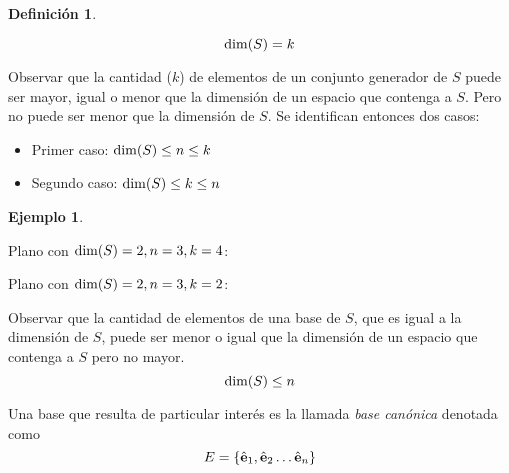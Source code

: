 \documentclass[a5paper,12pt,twoside]{book}
\newtheorem{defn}{{Definición}}[chapter]
\newtheorem{example}{{Ejemplo}}[chapter]
\begin{document}
\begin{mdframed}[style=MyFrame1]
    \begin{defn}
    \end{defn}
    \begin{equation*}
        \operatorname{dim}(S) = k
    \end{equation*}
\end{mdframed}

Observar que la cantidad ($k$) de elementos de un conjunto generador de $S$ puede ser mayor, igual o menor que la dimensión de un espacio que contenga a $S$. Pero no puede ser menor que la dimensión de $S$. Se identifican entonces dos casos:
\begin{itemize}
    \item Primer caso: $\operatorname{dim}(S) \leq n \leq k$
    \item Segundo caso: $\operatorname{dim}(S) \leq k \leq n$
\end{itemize}

\begin{mdframed}[style=MyFrame2]
    \begin{example}
    \end{example}
    Plano con $\operatorname{dim}(S)=2, n=3, k=4$:

    \begin{center}
        \def\svgwidth{0.6\linewidth}
        
    \end{center}

    Plano con $\operatorname{dim}(S)=2, n=3, k=2$:

    \begin{center}
        \def\svgwidth{0.6\linewidth}
        
    \end{center}
\end{mdframed}

Observar que la cantidad de elementos de una base de $S$, que es igual a la dimensión de $S$, puede ser menor o igual que la dimensión de un espacio que contenga a $S$ pero no mayor.
\begin{equation*}
    \operatorname{dim}(S)\leq n
\end{equation*}

Una base que resulta de particular interés es la llamada \emph{base canónica} denotada como
\begin{equation*}
    E = { \left\{ {\hat{\textbf{e}}_1,\hat{\textbf{e}}_2 \dots \hat{\textbf{e}}_n} \right\} }
\end{equation*}
\end{document}
